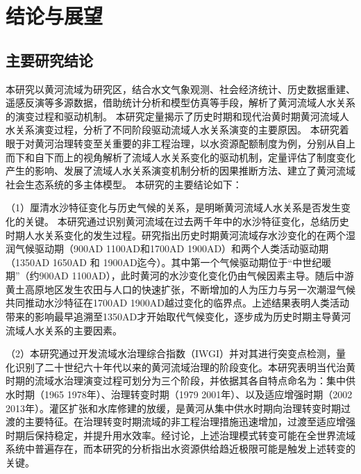 \chapter{结论与展望}

\section{主要研究结论}

本研究以黄河流域为研究区，结合水文气象观测、社会经济统计、历史数据重建、遥感反演等多源数据，借助统计分析和模型仿真等手段，解析了黄河流域人\textendash{}水关系的演变过程和驱动机制。
本研究定量揭示了历史时期和现代治黄时期黄河流域人\textendash{}水关系演变过程，分析了不同阶段驱动流域人\textendash{}水关系演变的主要原因。
本研究着眼于对黄河治理转变至关重要的非工程治理，以水资源配额制度为例，分别从自上而下和自下而上的视角解析了流域人\textendash{}水关系变化的驱动机制，定量评估了制度变化产生的影响、发展了流域人\textendash{}水关系演变机制分析的因果推断方法、建立了黄河流域社会\textendash{}生态系统的多主体模型。
本研究的主要结论如下：

（1）厘清水沙特征变化与历史气候的关系，是明晰黄河流域人\textendash{}水关系是否发生变化的关键。
本研究通过识别黄河流域在过去两千年中的水沙特征变化，总结历史时期人\textendash{}水关系变化的发生过程。研究指出历史时期黄河流域存水沙变化的在两个湿润气候驱动期（900AD \textendash{} 1100AD和1700AD \textendash{} 1900AD）和两个人类活动驱动期（1350AD \textendash{} 1650AD 和 1900AD迄今）。其中第一个气候驱动期位于“中世纪暖期”（约900AD \textendash{} 1100AD），此时黄河的水沙变化变化仍由气候因素主导。随后中游黄土高原地区发生农田与人口的快速扩张，不断增加的人为压力与另一次潮湿气候共同推动水沙特征在1700AD \textendash{} 1900AD越过变化的临界点。上述结果表明人类活动带来的影响最早追溯至1350AD才开始取代气候变化，逐步成为历史时期主导黄河流域人\textendash{}水关系的主要因素。

（2）本研究通过开发流域水治理综合指数（IWGI）并对其进行突变点检测，量化识别了二十世纪六十年代以来的黄河流域治理的阶段变化。本研究表明当代治黄时期的流域水治理演变过程可划分为三个阶段，并依据其各自特点命名为：集中供水时期（1965 \textendash{} 1978年）、治理转变时期（1979 \textendash{} 2001年）、以及适应增强时期（2002 \textendash{} 2013年）。灌区扩张和水库修建的放缓，是黄河从集中供水时期向治理转变时期过渡的主要特征。在治理转变时期流域的非工程治理措施迅速增加，过渡至适应增强时期后保持稳定，并提升用水效率。经讨论，上述治理模式转变可能在全世界流域系统中普遍存在，而本研究的分析指出水资源供给趋近极限可能是触发上述转变的关键。

